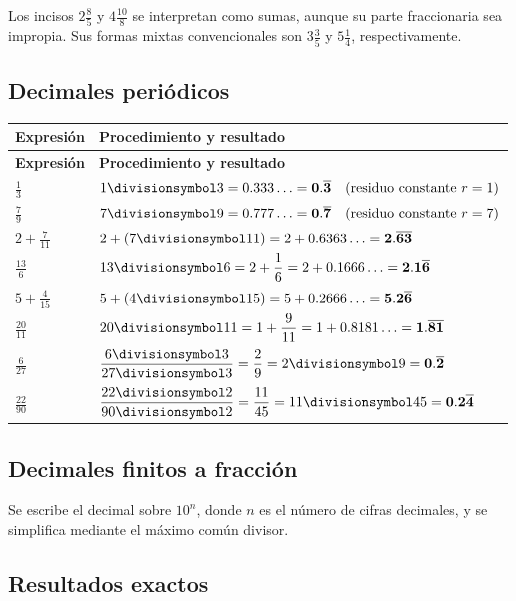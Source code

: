 \documentclass[spanish,letterpaper,oneside]{article}
\let\div\divisionsymbol
\begin{document}
Los incisos $2\frac85$ y $4\frac{10}{8}$ se interpretan como sumas, aunque su parte fraccionaria sea impropia. Sus formas mixtas convencionales son $3\frac35$ y $5\frac14$, respectivamente.\subsection*{Decimales periódicos}


{\small{}\renewcommand{\arraystretch}{1.32}
\begin{longtable}{|>{\raggedright\arraybackslash}p{}|>{\raggedright\arraybackslash}p{}|}\hline
\rowcolor{iiiepePale} \textbf{Expresión} & \textbf{Procedimiento y resultado} \\\hline
\endfirsthead
\hline
\rowcolor{iiiepePale} \textbf{Expresión} & \textbf{Procedimiento y resultado} \\\hline
\endhead
$\frac13$ & $1\div 3 = 0.333\ldots = \mathbf{0.\overline{3}}\quad (\text{residuo constante }r=1)$ \\\hline
$\frac79$ & $7\div 9 = 0.777\ldots = \mathbf{0.\overline{7}}\quad (\text{residuo constante }r=7)$ \\\hline
$2+\frac7{11}$ & $2+(7\div 11) = 2+0.6363\ldots = \mathbf{2.\overline{63}}$ \\\hline
$\frac{13}6$ & $13\div 6 = 2+\dfrac{1}{6} = 2+0.1666\ldots = \mathbf{2.1\overline{6}}$ \\\hline
$5+\frac4{15}$ & $5+(4\div 15) = 5+0.2666\ldots = \mathbf{5.2\overline{6}}$ \\\hline
$\frac{20}{11}$ & $20\div 11 = 1+\dfrac{9}{11} = 1+0.8181\ldots = \mathbf{1.\overline{81}}$ \\\hline
$\frac6{27}$ & $\dfrac{6\div 3}{27\div 3} = \dfrac{2}{9} = 2\div 9 = \mathbf{0.\overline{2}}$ \\\hline
$\frac{22}{90}$ & $\dfrac{22\div 2}{90\div 2} = \dfrac{11}{45} = 11\div 45 = \mathbf{0.2\overline{4}}$ \\\hline
\end{longtable}}

\subsection*{Decimales finitos a fracción}
Se escribe el decimal sobre $10^n$, donde $n$ es el número de cifras decimales, y se simplifica mediante el máximo común divisor.
\subsection*{Resultados exactos}
\end{document}
